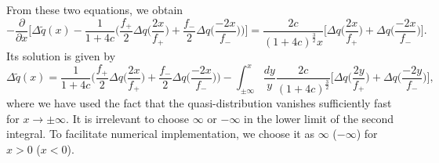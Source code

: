 %
From these two equations, we obtain
%
\begin{equation}
-\frac{\partial}{\partial x}\Big[\Delta \tilde q(x)-\frac{1}{1+4c}\Big(\frac{f_+}{2}\Delta q\Big(\frac{2x}{f_+}\Big)+\frac{f_-}{2}\Delta q\Big(\frac{-2x}{f_-}\Big)\Big)\Big]=\frac{2c}{(1+4c)^{\frac{3}{2}}x}\Big[\Delta q\Big(\frac{2x}{f_+}\Big)+\Delta q\Big(\frac{-2x}{f_-}\Big)\Big].
\end{equation}
%
Its solution is given by
%
\begin{equation}
\Delta \tilde q(x)=\frac{1}{1+4c}\Big(\frac{f_+}{2}\Delta q\Big(\frac{2x}{f_+}\Big)+\frac{f_-}{2}\Delta q\Big(\frac{-2x}{f_-}\Big)\Big)-\int_{\pm\infty}^x \frac{dy}{y}\frac{2c}{(1+4c)^{\frac{3}{2}}}\Big[\Delta q\Big(\frac{2y}{f_+}\Big)+\Delta q\Big(\frac{-2y}{f_-}\Big)\Big],
\end{equation}
%
where we have used the fact that the quasi-distribution vanishes sufficiently fast for $x\to\pm\infty$. It is irrelevant to choose $\infty$ or $-\infty$ in the lower limit of the second integral. To facilitate numerical implementation, we choose it as $\infty$ ($-\infty$) for $x>0$ ($x<0$).

